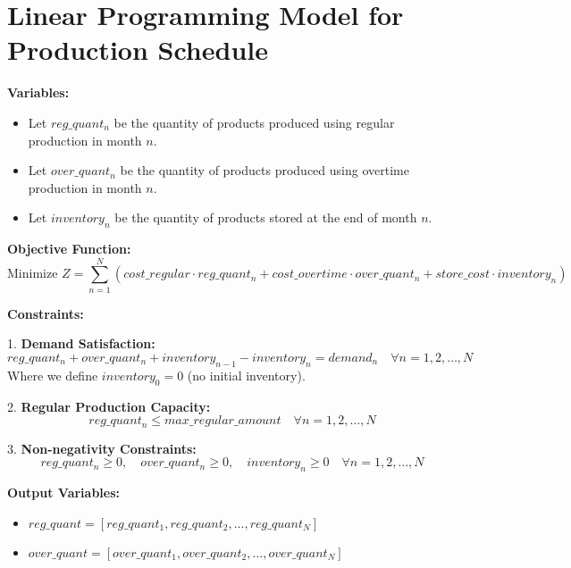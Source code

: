 \documentclass{article}
\begin{document}
\section*{Linear Programming Model for Production Schedule}

\textbf{Variables:}
\begin{itemize}
    \item Let $reg\_quant_n$ be the quantity of products produced using regular production in month $n$.
    \item Let $over\_quant_n$ be the quantity of products produced using overtime production in month $n$.
    \item Let $inventory_n$ be the quantity of products stored at the end of month $n$.
\end{itemize}

\textbf{Objective Function:}
\[
\text{Minimize } Z = \sum_{n=1}^{N} \left( cost\_regular \cdot reg\_quant_n + cost\_overtime \cdot over\_quant_n + store\_cost \cdot inventory_n \right)
\]

\textbf{Constraints:}

1. \textbf{Demand Satisfaction:}
\[
reg\_quant_n + over\_quant_n + inventory_{n-1} - inventory_n = demand_n \quad \forall n = 1, 2, \ldots, N
\]
Where we define $inventory_0 = 0$ (no initial inventory).

2. \textbf{Regular Production Capacity:}
\[
reg\_quant_n \leq max\_regular\_amount \quad \forall n = 1, 2, \ldots, N
\]

3. \textbf{Non-negativity Constraints:}
\[
reg\_quant_n \geq 0, \quad over\_quant_n \geq 0, \quad inventory_n \geq 0 \quad \forall n = 1, 2, \ldots, N
\]

\textbf{Output Variables:}
\begin{itemize}
    \item $reg\_quant = [reg\_quant_1, reg\_quant_2, \ldots, reg\_quant_N]$
    \item $over\_quant = [over\_quant_1, over\_quant_2, \ldots, over\_quant_N]$
\end{itemize}
\end{document}
